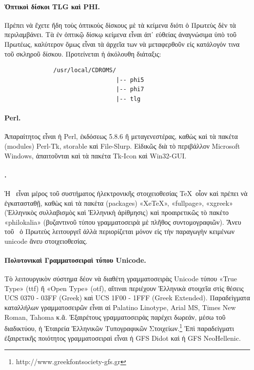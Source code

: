 \documentclass[12pt,a4paper]{article}
\begin{document}
  \paragraph{Ὀπτικοὶ δίσκοι TLG καὶ PHI.}
    Πρέπει νὰ ἔχετε ἤδη τοὺς ὀπτικοὺς δίσκους μὲ τὰ κείμενα
    διότι ὁ Πρωτεὺς δὲν τὰ περιλαμβάνει.
    Τὰ ἐν ὀπτικῷ δίσκῳ κείμενα εἶναι ἀπ᾽ εὐθείας ἀναγνώσιμα ὑπὸ
    τοῦ Πρωτέως, καλύτερον ὅμως εἶναι τὰ ἀρχεῖα των νὰ μεταφερθοῦν εἰς
    κατάλογόν τινα τοῦ σκληροῦ δίσκου. Προτείνεται ἡ ἀκόλουθη διάταξις:
  \begin{verbatim}
              /usr/local/CDROMS/
                                |-- phi5
                                |-- phi7
                                |-- tlg
  \end{verbatim}
  \paragraph{Perl.}
    Ἀπαραίτητος εἶναι ἡ Perl, ἐκδόσεως 5.8.6 ἢ μεταγενεστέρας,
    καθὼς καὶ τὰ πακέτα (modules) Perl-Tk, storable καὶ File-Slurp.
    Εἰδικῶς διὰ τὸ περιβάλλον Microsoft Windows, ἀπαιτοῦνται καὶ τὰ
    πακέτα Tk-Icon καὶ Win32-GUI.
  \paragraph{\XeTeX.}
    Ἡ \XeTeX\ εἶναι μέρος τοῦ συστήματος ἠλεκτρονικῆς στοιχειοθεσίας
    \TeX\ οἷον καὶ πρέπει νὰ ἐγκατασταθῇ, καθὼς καὶ τὰ πακέτα
    (packages) «XeTeX», «fullpage», «xgreek» (Ἑλληνικὸς συλλαβισμὸς
    καὶ Ἑλληνικὴ ἀρίθμησις) καὶ προαιρετικῶς τὸ πακέτο
    «philokalia» (βυζαντινοῦ τύπου γραμματοσειρὰ μὲ πλῆθος
    συντομογραφιῶν). Ἄνευ τοῦ \XeTeX\ ὁ Πρωτεὺς λειτουργεῖ
    ἀλλὰ περιορίζεται μόνον εἰς τὴν παραγωγὴν κειμένων unicode ἄνευ
    στοιχειοθεσίας.
  \paragraph{Πολυτονικαὶ Γραμματοσειραὶ τύπου Unicode.}
    Τὸ λειτουργικὸν σύστημα δέον νὰ διαθέτη γραμματοσειρὰς Unicode
    τύπου «True Type» (ttf) ἢ «Open Type» (otf), αἵτιναι περιέχουν
    Ἑλληνικὰ στοιχεῖα στὶς θέσεις UCS 0370 - 03FF (Greek)
    καὶ UCS 1F00 - 1FFF (Greek Extended).
    Παραδεὶγματα καταλλήλων γραμματοσειρῶν εἶναι αἱ Palatino Linotype,
    Arial MS, Times New Roman, Tahoma κ.ἄ.
    Ἐξαιρέτους γραμματοσειρὰς παρέχει
    δωρεάν, μέσω τοῦ διαδικτύου, ἡ Ἑταιρεία Ἑλληνικῶν Τυπογραφικῶν
    Στοιχείων.\footnote{http://www.greekfontsociety-gfs.gr}
    Ἐπὶ παραδείγματι ἐξαιρετικῆς ποιότητος γραμματοσειραὶ εἶναι
    ἡ GFS Didot καὶ ἡ GFS NeoHellenic.
%
\end{document}
